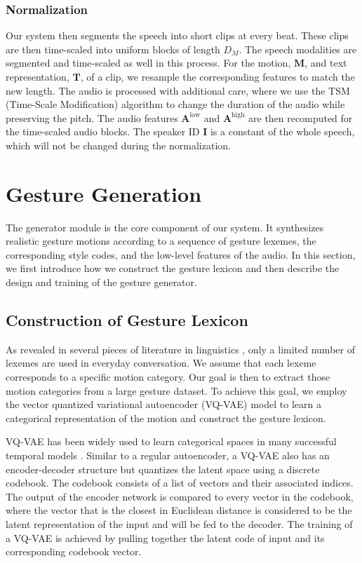 \documentclass[acmtog,authorversion]{acmart}
\newcommand{\vect}[1]{\bm{#1}}
\newcommand{\eqword}[1]{{\text{#1}}}
\begin{document}
\subsubsection{Normalization}
\label{subsubsec:normalization}
Our system then segments the speech into short clips at every beat. These clips are then time-scaled into uniform blocks of length $D_M$. The speech modalities are segmented and time-scaled as well in this process. For the motion, $\vect{M}$, and text representation, $\vect{T}$, of a clip, we resample the corresponding features to match the new length. The audio is processed with additional care, where we use the TSM (Time-Scale Modification) algorithm to change the duration of the audio while preserving the pitch. The audio features $\vect{A}^{\eqword{low}}$ and $\vect{A}^{\eqword{high}}$ are then recomputed for the time-scaled audio blocks. The speaker ID $\vect{I}$ is a constant of the whole speech, which will not be changed during the normalization. \section{Gesture Generation}
\label{sec:gesture_generation}
The generator module is the core component of our system. It synthesizes realistic gesture motions according to a sequence of gesture lexemes, the corresponding style codes, and the low-level features of the audio. In this section, we first introduce how we construct the gesture lexicon and then describe the design and training of the gesture generator.

\subsection{Construction of Gesture Lexicon}
\label{subsec:gesture_style_embedding}
As revealed in several pieces of literature in linguistics \cite{Neff2008Gesture,Kipp2004_Gesture,Webb1996_Linguistic}, only a limited number of lexemes are used in everyday conversation. We assume that each lexeme corresponds to a specific motion category. Our goal is then to extract those motion categories from a large gesture dataset. To achieve this goal, we employ the vector quantized variational autoencoder (VQ-VAE) model \cite{oord2017neural} to learn a categorical representation of the motion and construct the gesture lexicon.

VQ-VAE has been widely used to learn categorical spaces in many successful temporal models \cite{prafulla2020jukebox, baevski2020vq-wav2vec, yan2021videogpt,ramesh2021DALLE}. Similar to a regular autoencoder, a VQ-VAE also has an encoder-decoder structure but quantizes the latent space using a discrete codebook. The codebook consists of a list of vectors and their associated indices. The output of the encoder network is compared to every vector in the codebook, where the vector that is the closest in Euclidean distance is considered to be the latent representation of the input and will be fed to the decoder. The training of a VQ-VAE is achieved by pulling together the latent code of input and its corresponding codebook vector.
\end{document}
